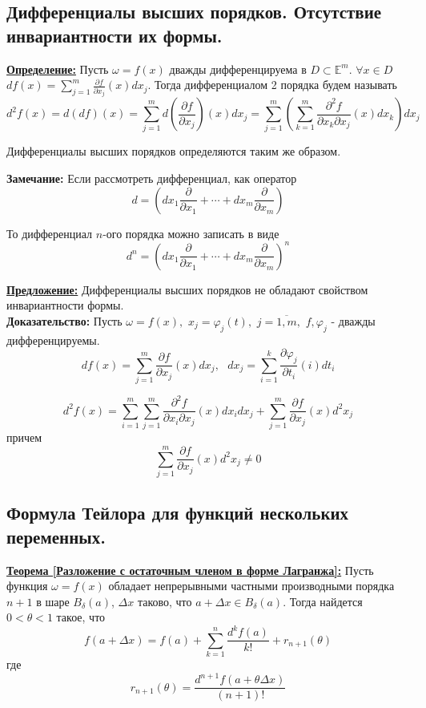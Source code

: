 \documentclass[a4paper,12pt]{article} %
\begin{document}
	\subsection{Дифференциалы высших порядков. Отсутствие инвариантности их формы.}
	
	\underline{\textbf{Определение:}} Пусть $\omega = f(x)$ дважды дифференцируема в $D \subset \mathbb{E}^m$. $\forall x\in D $ $df(x) = \sum\limits_{j=1}^m\frac{\partial f}{\partial x_j}(x)dx_j$. Тогда дифференциалом 2 порядка будем называть
	\[
	d^2f(x) =d(df)(x) = \sum\limits_{j=1}^md\left(\frac{\partial f}{\partial x_j}\right)(x)dx_j= \sum\limits_{j=1}^m\left(\sum\limits_{k=1}^m
	\frac{\partial^2f}{\partial x_k\partial x_j}(x)dx_k\right)dx_j
	\]
	
	Дифференциалы высших порядков определяются таким же образом.
	\vspace{5mm}
	
	\textbf{Замечание:} Если рассмотреть дифференциал, как оператор
	\[
	d = \left(dx_1\frac{\partial}{\partial x_1}+\cdots+dx_m\frac{\partial}{\partial x_m}\right)
	\]
	
	То дифференциал $n$-ого порядка можно записать в виде
	\[
	d^n = \left(dx_1\frac{\partial}{\partial x_1}+\cdots+dx_m\frac{\partial}{\partial x_m}\right)^n
	\]
	
	\underline{\textbf{Предложение:}} Дифференциалы высших порядков не обладают свойством инвариантности формы.\\
	
	\textbf{Доказательство:} Пусть $\omega = f(x), $ $x_j=\varphi_j(t), $  $j=\overline{1, m}, $ $f, \varphi_j$ - дважды дифференцируемы.
	\[
	df(x) = \sum\limits_{j=1}^m\frac{\partial f}{\partial x_j}(x)dx_j, \text{ }dx_j = \sum\limits_{i=1}^k\frac{\partial \varphi_j}{\partial t_i}(i)dt_i
	\]
	
	\[
	d^2f(x) = \sum\limits_{i=1}^m\sum\limits_{j=1}^m
	\frac{\partial^2f}{\partial x_i\partial x_j}(x)dx_idx_j+\sum\limits_{j=1}^m\frac{\partial f}{\partial x_j}(x)d^2x_j
	\]
	причем
	\[
	\sum\limits_{j=1}^m\frac{\partial f}{\partial x_j}(x)d^2x_j \neq 0
	\]
	
	\subsection{Формула Тейлора для функций нескольких переменных.}
	
	\underline{\textbf{Теорема [Разложение с остаточным членом в форме Лагранжа]:}} Пусть функция $\omega = f(x)$ обладает непрерывными частными производными порядка $n+1$ в шаре $B_\delta(a)$, $\Delta x$ таково, что $a+\Delta x\in B_\delta(a)$. Тогда найдется $0<\theta<1$ такое, что 
	\[
	f(a+\Delta x) = f(a) + \sum\limits_{k=1}^n\frac{d^k f(a)}{k!}+r_{n+1}(\theta)
	\]
	где
	\[
	r_{n+1}(\theta) = \frac{d^{n+1}f(a+\theta \Delta x)}{(n+1)!}
	\]
	
\end{document}
